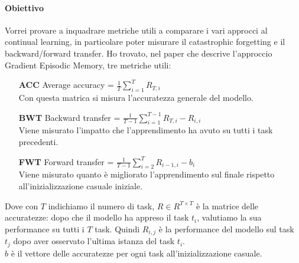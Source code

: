 \documentclass[11pt, a4paper, twoside, openright]{book}
\begin{document}
\paragraph{Obiettivo} Vorrei provare a inquadrare metriche utili a comparare i vari approcci al continual learning, in particolare poter misurare il catastrophic forgetting e il backward/forward transfer. Ho trovato, nel paper che descrive l'approccio Gradient Episodic Memory, tre metriche utili:
\begin{itemize}
    \item[\textbf{ACC}] Average accuracy = $\frac{1}{T}\sum_{i=1}^T R_{T,i}$\\
    Con questa matrica si misura l'accuratezza generale del modello.
    \item[\textbf{BWT}] Backward transfer = $\frac{1}{T-1}\sum_{i=1}^{T-1} R_{T,i} - R_{i,i}$\\
    Viene misurato l'impatto che l'apprendimento ha avuto su tutti i task precedenti.
    \item[\textbf{FWT}] Forward transfer = $\frac{1}{T-1}\sum_{i=2}^T R_{i-1,i} - b_i$\\
    Viene misurato quanto è migliorato l'apprendimento sul finale rispetto all'inizializzazione casuale iniziale.
\end{itemize}
Dove con $T$ indichiamo il numero di task, $R \in R^{T\times T}$ è la matrice delle accuratezze: dopo che il modello ha appreso il task $t_i$, valutiamo la sua performance su tutti i $T$ task. Quindi $R_{i,j}$ è la performance del modello sul task $t_j$ dopo aver osservato l'ultima istanza del task $t_i$.\\
$b$ è il vettore delle accuratezze per ogni task all'inizializzazione casuale.
\end{document}
